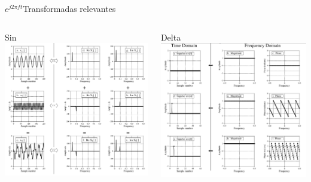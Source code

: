 \begin{frame}{$e^{j2\pi ft}$}{Transformadas relevantes}
   \begin{columns}[c]
      \begin{column}{.33\textwidth}
         Sin
         \centering\includegraphics[width=1.0\textwidth]{3_clase/equivalencias_seno}
      \end{column}
      \begin{column}{.33\textwidth}
         Delta
         \centering\includegraphics[width=1.0\textwidth]{3_clase/equivalencias_delta}

\end{column}
\end{columns}
\end{frame}
